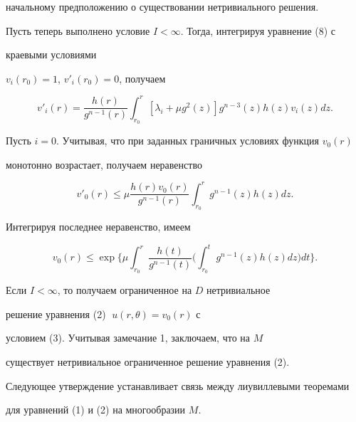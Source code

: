 \begin{pf}
начальному предположению о существовании нетривиального решения.





Пусть теперь выполнено условие $I<\infty$. Тогда, интегрируя уравнение (8) с


краевыми условиями


$v_i(r_0) = 1$, $v'_i(r_0)=0$, получаем


$$


v'_i(r)=\frac{h(r)}{g^{n-1}(r)}


\int_{r_0}^{r}[\lambda_i + \mu g^2(z)]g^{n-3}(z)


h(z)v_i(z)dz.


$$





Пусть $i=0$. Учитывая, что при заданных граничных условиях функция $v_0(r)$


монотонно возрастает, получаем неравенство


$$


v'_0(r)\le \mu\frac{h(r)v_0(r)}{g^{n-1}(r)}


\int_{r_0}^{r}g^{n-1}(z)h(z)dz.


$$





Интегрируя последнее неравенство, имеем


$$


v_0(r) \le \exp \biggl\{ \mu\int_{r_0}^{r}\frac{h(t)}{g^{n-1}(t)}


\biggl(\int_{r_0}^{t}g^{n-1}(z) h(z)dz \biggr) dt \biggr\}.


$$





Если $I<\infty$, то получаем ограниченное на $D$ нетривиальное


решение уравнения (2) $\;u(r,\theta)=v_0(r)$ с


условием (3). Учитывая замечание 1, заключаем, что на $M$


существует нетривиальное ограниченное решение уравнения (2).


\end{pf}





Следующее утверждение устанавливает связь между лиувиллевыми теоремами


для уравнений (1) и (2) на многообразии $M$.






